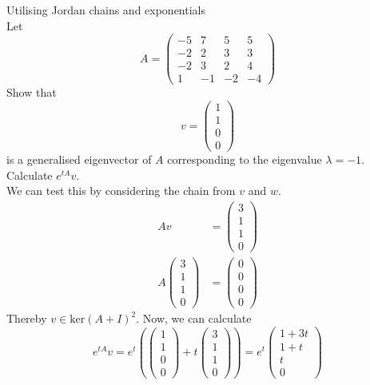 \documentclass[journal, letterpaper]{IEEEtran}
\begin{document}
    \begin{myboxg}{Utilising Jordan chains and exponentials} \\
        Let
        $$ A = \begin{pmatrix}
            -5 & 7 & 5 & 5 \\
            -2 & 2 & 3 & 3 \\
            -2 & 3 & 2 & 4 \\
            1 & -1 & -2 & -4
        \end{pmatrix}$$
        Show that
        $$ v = \begin{pmatrix}
            1 \\ 1 \\ 0 \\ 0
        \end{pmatrix}$$
        is a generalised eigenvector of $A$ corresponding to the eigenvalue $\lambda = -1$. Calculate $e^{tA}v$.
        \newline \\ 
        We can test this by considering the chain from $v$ and $w$.
        \begin{align*}
            Av &= \begin{pmatrix}
                3 \\ 1 \\ 1 \\ 0
            \end{pmatrix} \\ 
            A\begin{pmatrix}
                3 \\ 1 \\ 1 \\ 0
            \end{pmatrix} & = \begin{pmatrix}
                0 \\ 0 \\ 0 \\ 0
            \end{pmatrix}
        \end{align*}
        Thereby $v \in \text{ker}(A + I)^2$. Now, we can calculate
        $$ e^{tA}v = e^{t}\left(\begin{pmatrix}
            1 \\ 1 \\ 0 \\ 0
        \end{pmatrix} + t\begin{pmatrix}
            3 \\ 1 \\ 1 \\0
        \end{pmatrix} \right) = e^t \begin{pmatrix}
            1 + 3t \\ 1 + t \\ t \\ 0
        \end{pmatrix}$$
    \end{myboxg}
\end{document}
